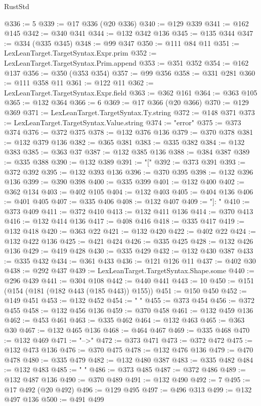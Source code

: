 \begin{lexlean}{RustStd}
\begin{coremodule}
{\begin{coremodule}
{{{{{{{{{{{{{{{{{{{{{{{{{{{{{{{@336 := 5
@339 := @17 @336 (@20 @336)
@340 := @129 @339
@341 := @162 @145
@342 := @340 @341
@344 := @132 @342 @136
@345 := @135 @344
@347 := @334 (@335 @345)
@348 := @99 @347
@350 := @111 @84 @11
@351 := LexLeanTarget.TargetSyntax.Expr.prim
@352 := LexLeanTarget.TargetSyntax.Prim.append
@353 := @351 @352
@354 := @162 @137
@356 := @350 (@353 @354)
@357 := @99 @356
@358 := @331 @281
@360 := @111 @358 @11
@361 := @122 @11
@362 := LexLeanTarget.TargetSyntax.Expr.field
@363 := @362 @161
@364 := @363 @105
@365 := @132 @364
@366 := 6
@369 := @17 @366 (@20 @366)
@370 := @129 @369
@371 := LexLeanTarget.TargetSyntax.Ty.string
@372 := @148 @371
@373 := LexLeanTarget.TargetSyntax.Value.string
@374 := "error"
@375 := @373 @374
@376 := @372 @375
@378 := @132 @376 @136
@379 := @370 @378
@381 := @132 @379 @136
@382 := @365 @381
@383 := @335 @382
@384 := @132 @383
@385 := @363 @37
@387 := @132 @385 @136
@388 := @384 @387
@389 := @335 @388
@390 := @132 @389
@391 := "["
@392 := @373 @391
@393 := @372 @392
@395 := @132 @393 @136
@396 := @370 @395
@398 := @132 @396 @136
@399 := @390 @398
@400 := @335 @399
@401 := @132 @400
@402 := @362 @134
@403 := @402 @105
@404 := @132 @403
@405 := @404 @136
@406 := @401 @405
@407 := @335 @406
@408 := @132 @407
@409 := "]: "
@410 := @373 @409
@411 := @372 @410
@413 := @132 @411 @136
@414 := @370 @413
@416 := @132 @414 @136
@417 := @408 @416
@418 := @335 @417
@419 := @132 @418
@420 := @363 @22
@421 := @132 @420
@422 := @402 @22
@424 := @132 @422 @136
@425 := @421 @424
@426 := @335 @425
@428 := @132 @426 @136
@429 := @419 @428
@430 := @335 @429
@432 := @132 @430 @387
@433 := @335 @432
@434 := @361 @433
@436 := @121 @126 @11
@437 := @402 @30
@438 := @292 @437
@439 := LexLeanTarget.TargetSyntax.Shape.some
@440 := @296 @439
@441 := @304 @108
@442 := @440 @441
@443 := 10
@450 := @151 (@154 (@181 (@182 @443 (@185 @443)) @155))
@451 := @150 @450
@452 := @149 @451
@453 := @132 @452
@454 := "  "
@455 := @373 @454
@456 := @372 @455
@458 := @132 @456 @136
@459 := @370 @458
@461 := @132 @459 @136
@462 := @453 @461
@463 := @335 @462
@464 := @132 @463
@465 := @363 @30
@467 := @132 @465 @136
@468 := @464 @467
@469 := @335 @468
@470 := @132 @469
@471 := "-->"
@472 := @373 @471
@473 := @372 @472
@475 := @132 @473 @136
@476 := @370 @475
@478 := @132 @476 @136
@479 := @470 @478
@480 := @335 @479
@482 := @132 @480 @387
@483 := @335 @482
@484 := @132 @483
@485 := " "
@486 := @373 @485
@487 := @372 @486
@489 := @132 @487 @136
@490 := @370 @489
@491 := @132 @490
@492 := 7
@495 := @17 @492 (@20 @492)
@496 := @129 @495
@497 := @496 @313
@499 := @132 @497 @136
@500 := @491 @499
}}}}}}}}}}}}}}}}}}}}}}}}}}}}}}}
\end{coremodule}}
\end{coremodule}
\end{lexlean}
